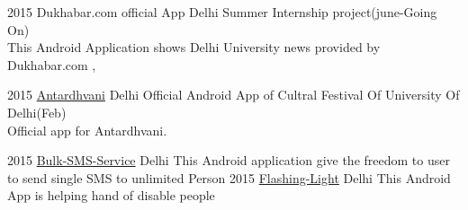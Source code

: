 \documentclass[]{friggeri-cv}
\begin{document}
\begin{entrylist}
  \entry
    {2015}
    {{Dukhabar.com official App}}
    {{Delhi}}
    {{Summer Internship project(june-Going On)} \\This Android Application shows Delhi University news
    provided by Dukhabar.com , 
    }

  \entry
    {2015}
    {\href{https://github.com/teamDAPSR/Antardhvani}{Antardhvani}}
    {{Delhi}}
    {{Official Android App of Cultral Festival Of University Of Delhi(Feb)} \\Official app for Antardhvani. 
    }

  \entry
    {2015}
    {\href{https://github.com/therajanmaurya/Bulk-SMS-Service-final}{Bulk-SMS-Service}}
    {Delhi}
    {This Android application give the freedom to user to send single SMS to unlimited Person }
  \entry
    {2015}
    {\href{https://github.com/therajanmaurya/Flashing-Light}{Flashing-Light}}
    {Delhi}
    {This Android App is helping hand of disable people
    }
\end{entrylist}
\end{document}
